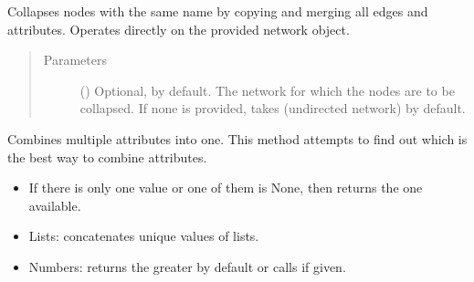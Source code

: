 \documentclass[letterpaper,10pt,english]{sphinxmanual}
\begin{document}
\begin{fulllineitems}
\begin{fulllineitems}
\begin{quote}
\begin{description}
\end{description}\end{quote}

\end{fulllineitems}


\begin{fulllineitems}
\label{\detokenize{reference:pypath.main.PyPath.collapse_by_name}}
Collapses nodes with the same name by copying and merging
all edges and attributes. Operates directly on the provided
network object.
\begin{quote}\begin{description}
\item[{Parameters}] \leavevmode
{} () \textendash{} Optional,  by default. The network for which the
nodes are to be collapsed. If none is provided, takes
 (undirected network) by
default.

\end{description}\end{quote}

\end{fulllineitems}


\begin{fulllineitems}
\label{\detokenize{reference:pypath.main.PyPath.combine_attr}}
Combines multiple attributes into one. This method attempts
to find out which is the best way to combine attributes.
\begin{itemize}
\item {} 
If there is only one value or one of them is None, then
returns the one available.

\item {} 
Lists: concatenates unique values of lists.

\item {} 
Numbers: returns the greater by default or calls
 if given.


\end{itemize}
\end{fulllineitems}
\end{fulllineitems}
\end{document}
